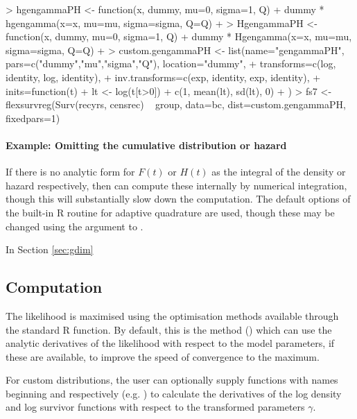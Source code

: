 \documentclass[nojss,nofooter]{jss}
\begin{document}
\begin{Schunk}
\begin{Sinput}
> hgengammaPH <- function(x, dummy, mu=0, sigma=1, Q){
+     dummy * hgengamma(x=x, mu=mu, sigma=sigma, Q=Q)
+ }
> HgengammaPH <- function(x, dummy, mu=0, sigma=1, Q){
+     dummy * Hgengamma(x=x, mu=mu, sigma=sigma, Q=Q)
+ }
> custom.gengammaPH <- list(name="gengammaPH", pars=c("dummy","mu","sigma","Q"), location="dummy",
+                           transforms=c(log, identity, log, identity),
+                           inv.transforms=c(exp, identity, exp, identity),
+                           inits=function(t){
+                               lt <- log(t[t>0])
+                               c(1, mean(lt), sd(lt), 0)
+                           })
> fs7 <- flexsurvreg(Surv(recyrs, censrec) ~ group, data=bc, dist=custom.gengammaPH, fixedpars=1)
\end{Sinput}
\end{Schunk}



\paragraph{Example: Omitting the cumulative distribution or hazard}

If there is no analytic form for $F(t)$ or $H(t)$ as the integral of
the density or hazard respectively, then  can compute
these internally by numerical integration, though this will
substantially slow down the computation.  The default options of the
built-in R routine  for adaptive quadrature are used,
though these may be changed using the  argument to
.


In Section \ref{sec:gdim} 


\subsection{Computation}

The likelihood is maximised using the optimisation methods available
through the standard R  function.  By default, this is the
 method (\citep{nash}) which can use the analytic
derivatives of the likelihood with respect to the model parameters, if
these are available, to improve the speed of convergence to the
maximum.

For custom distributions, the user can optionally supply functions
with names beginning  and  respectively
(e.g. ) to calculate the derivatives of
the log density and log survivor functions with respect to the
transformed parameters $\gamma$.
\end{document}
